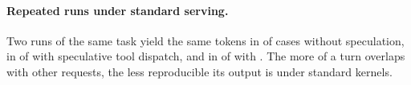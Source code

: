 \paragraph{Repeated runs under standard serving.}
Two runs of the same task yield the same tokens in \StdRepeatSameNone{} of \StdRepeatPairsNone{} cases without speculation, in \StdRepeatSameDisp{} of \StdRepeatPairsDisp{} with speculative tool dispatch, and in \StdRepeatSameOurs{} of \StdRepeatPairsOurs{} with \method.
The more of a turn overlaps with other requests, the less reproducible its output is under standard kernels.
